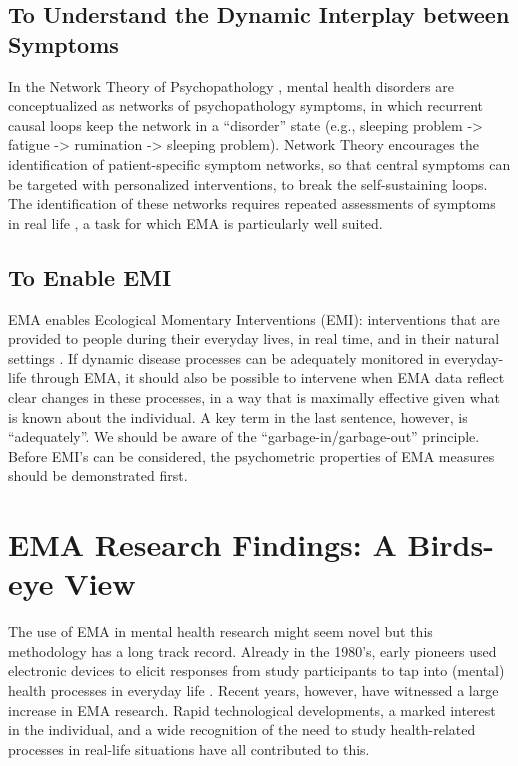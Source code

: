 \documentclass[]{book}
\begin{document}
\subsection{To Understand the Dynamic Interplay between
Symptoms}\label{to-understand-the-dynamic-interplay-between-symptoms}

In the Network Theory of Psychopathology
\citep{Borsboom2013, Borsboom2017}, mental health disorders are
conceptualized as networks of psychopathology symptoms, in which
recurrent causal loops keep the network in a ``disorder'' state (e.g.,
sleeping problem -\textgreater{} fatigue -\textgreater{} rumination
-\textgreater{} sleeping problem). Network Theory encourages the
identification of patient-specific symptom networks, so that central
symptoms can be targeted with personalized interventions, to break the
self-sustaining loops. The identification of these networks requires
repeated assessments of symptoms in real life \citep[see,
e.g.,][]{Bringmann2015}, a task for which EMA is particularly well
suited.

\subsection{To Enable EMI}\label{to-enable-emi}


EMA enables Ecological Momentary Interventions (EMI): interventions that
are provided to people during their everyday lives, in real time, and in
their natural settings \citep{heron2010}. If dynamic disease processes
can be adequately monitored in everyday-life through EMA, it should also
be possible to intervene when EMA data reflect clear changes in these
processes, in a way that is maximally effective given what is known
about the individual. A key term in the last sentence, however, is
``adequately''. We should be aware of the ``garbage-in/garbage-out''
principle. Before EMI's can be considered, the psychometric properties
of EMA measures should be demonstrated first.

\section{EMA Research Findings: A Birds-eye
View}\label{ema-research-findings-a-birds-eye-view}

The use of EMA in mental health research might seem novel but this
methodology has a long track record. Already in the 1980's, early
pioneers used electronic devices to elicit responses from study
participants to tap into (mental) health processes in everyday life
\citep[see, e.g.,][]{Csikszentmihalyi2014}. Recent years, however, have
witnessed a large increase in EMA research. Rapid technological
developments, a marked interest in the individual, and a wide
recognition of the need to study health-related processes in real-life
situations have all contributed to this.
\end{document}
